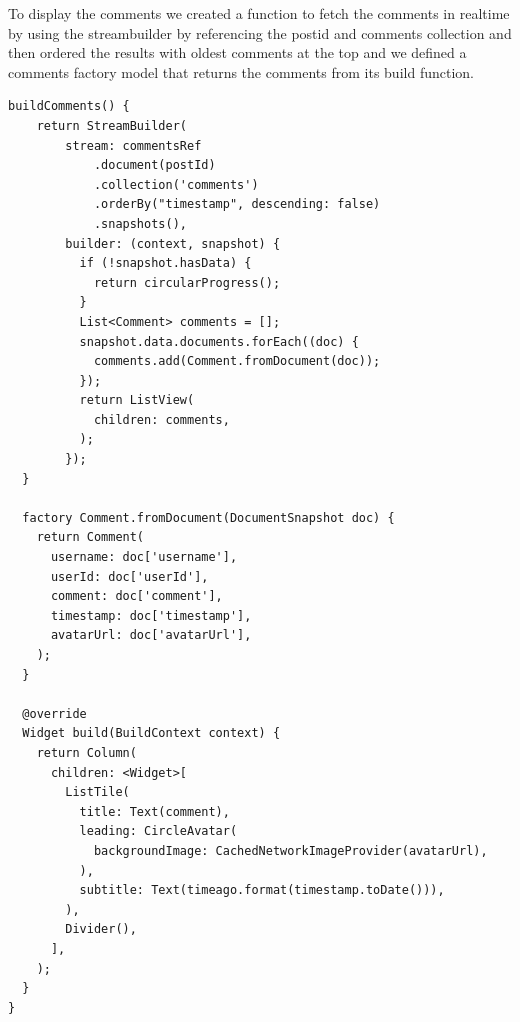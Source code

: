 To display the comments we created a function to fetch the comments in realtime by using the streambuilder by referencing the postid and comments collection and then ordered the results with oldest comments at the top and we defined a comments factory model that returns the comments from its build function.
\begin{verbatim}
buildComments() {
    return StreamBuilder(
        stream: commentsRef
            .document(postId)
            .collection('comments')
            .orderBy("timestamp", descending: false)
            .snapshots(),
        builder: (context, snapshot) {
          if (!snapshot.hasData) {
            return circularProgress();
          }
          List<Comment> comments = [];
          snapshot.data.documents.forEach((doc) {
            comments.add(Comment.fromDocument(doc));
          });
          return ListView(
            children: comments,
          );
        });
  }
  
  factory Comment.fromDocument(DocumentSnapshot doc) {
    return Comment(
      username: doc['username'],
      userId: doc['userId'],
      comment: doc['comment'],
      timestamp: doc['timestamp'],
      avatarUrl: doc['avatarUrl'],
    );
  }
  
  @override
  Widget build(BuildContext context) {
    return Column(
      children: <Widget>[
        ListTile(
          title: Text(comment),
          leading: CircleAvatar(
            backgroundImage: CachedNetworkImageProvider(avatarUrl),
          ),
          subtitle: Text(timeago.format(timestamp.toDate())),
        ),
        Divider(),
      ],
    );
  }
}
\end{verbatim}
